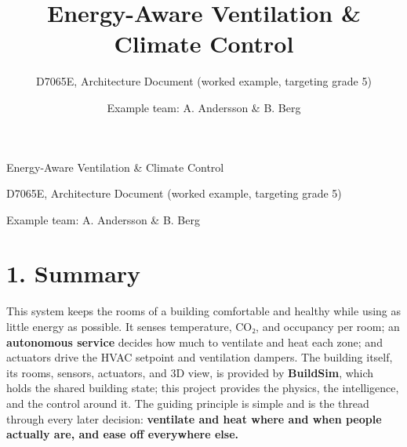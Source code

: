 \documentclass[
  11pt,
]{article}
\title{Energy-Aware Ventilation \& Climate Control}
\subtitle{D7065E, Architecture Document (worked example, targeting
grade 5)}
\author{Example team: A. Andersson \& B. Berg}
\date{}
\begin{document}
{\setlength{\fboxsep}{7pt}\setlength{\fboxrule}{0.6pt}%
\begin{center}
\end{center}}

\vspace{1.2em}

\begin{center}
{\LARGE Energy-Aware Ventilation \& Climate Control\par}
\vspace{0.5em}
{\large D7065E, Architecture Document (worked example, targeting grade 5)\par}
\vspace{1em}
{Example team: A. Andersson \& B. Berg\par}
\end{center}

\vspace{1.2em}

{
\hypersetup{linkcolor=black}
\setcounter{tocdepth}{3}
\tableofcontents
}

\hypertarget{summary}{%
\section{1. Summary}\label{summary}}

This system keeps the rooms of a building comfortable and healthy while
using as little energy as possible. It senses temperature, CO₂, and
occupancy per room; an \textbf{autonomous service} decides how much to
ventilate and heat each zone; and actuators drive the HVAC setpoint and
ventilation dampers. The building itself, its rooms, sensors,
actuators, and 3D view, is provided by \textbf{BuildSim}, which holds
the shared building state; this project provides the physics, the intelligence, and
the control around it. The guiding principle is simple and is the thread
through every later decision: \textbf{ventilate and heat where and when
people actually are, and ease off everywhere else.}
\end{document}
